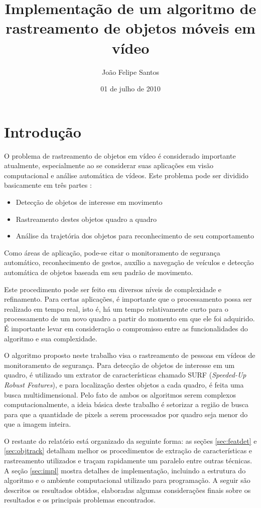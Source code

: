 \documentclass[a4paper]{coursepaper-br}
\title{Implementação de um algoritmo de rastreamento de objetos móveis em vídeo}
\author{João Felipe Santos}
\date{01 de julho de 2010}
\begin{document}
\maketitle
 
\section{Introdução}

O problema de rastreamento de objetos em vídeo é considerado
importante atualmente, especialmente ao se considerar suas aplicações
em visão computacional e análise automática de vídeos. Este problema
pode ser dividido basicamente em três partes \cite{Yilmaz2006}:

\begin{itemize}
 \item Detecção de objetos de interesse em movimento 
 \item Rastreamento destes objetos quadro a quadro
 \item Análise da trajetória dos objetos para reconhecimento de seu
   comportamento
\end{itemize}

Como áreas de aplicação, pode-se citar o monitoramento de segurança
automático, reconhecimento de gestos, auxílio a navegação de veículos
e detecção automática de objetos baseada em seu padrão de movimento.

Este procedimento pode ser feito em diversos níveis de complexidade e
refinamento. Para certas aplicações, é importante que o processamento
possa ser realizado em tempo real, isto é, há um tempo relativamente
curto para o processamento de um novo quadro a partir do momento em
que ele foi adquirido. É importante levar em consideração o
compromisso entre as funcionalidades do algoritmo e sua complexidade.

O algoritmo proposto neste trabalho visa o rastreamento de pessoas em
vídeos de monitoramento de segurança. Para detecção de objetos de
interesse em um quadro, é utilizado um extrator de características
chamado SURF (\emph{Speeded-Up Robust Features}), e para localização
destes objetos a cada quadro, é feita uma busca multidimensional. Pelo
fato de ambos os algoritmos serem complexos computacionalmente, a
ideia básica deste trabalho é setorizar a região de busca para que a
quantidade de pixels a serem processados por quadro seja menor do que
a imagem inteira.

O restante do relatório está organizado da seguinte forma: as seções
\ref{sec:featdet} e \ref{sec:objtrack} detalham melhor os
procedimentos de extração de características e rastreamento utilizados
e traçam rapidamente um paralelo entre outras técnicas. A seção
\ref{sec:impl} mostra detalhes de implementação, incluindo a estrutura
do algoritmo e o ambiente computacional utilizado para programação. A
seguir são descritos os resultados obtidos, elaboradas algumas
considerações finais sobre os resultados e os principais problemas
encontrados.
\end{document}
